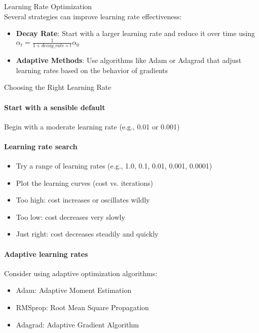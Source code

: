 \begin{concept}{Learning Rate Optimization}\\
Several strategies can improve learning rate effectiveness:
\begin{itemize}
    \item \textbf{Decay Rate}: Start with a larger learning rate and reduce it over time using $\alpha_t = \frac{1}{1+decay\_rate \times t}\alpha_0$
    \item \textbf{Adaptive Methods}: Use algorithms like Adam or Adagrad that adjust learning rates based on the behavior of gradients
\end{itemize}
\end{concept}

\begin{KR}{Choosing the Right Learning Rate}\\
\paragraph{Start with a sensible default}
Begin with a moderate learning rate (e.g., 0.01 or 0.001)

\paragraph{Learning rate search}
\begin{itemize}
    \item Try a range of learning rates (e.g., 1.0, 0.1, 0.01, 0.001, 0.0001)
    \item Plot the learning curves (cost vs. iterations)
    \item Too high: cost increases or oscillates wildly
    \item Too low: cost decreases very slowly
    \item Just right: cost decreases steadily and quickly
\end{itemize}

\paragraph{Adaptive learning rates}
Consider using adaptive optimization algorithms:
\begin{itemize}
    \item Adam: Adaptive Moment Estimation
    \item RMSprop: Root Mean Square Propagation
    \item Adagrad: Adaptive Gradient Algorithm
\end{itemize}


\end{KR}
